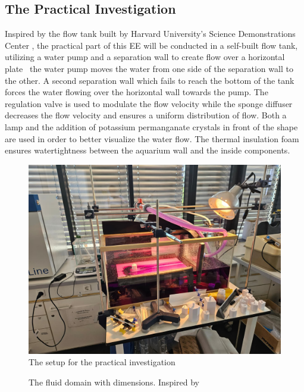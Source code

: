 \subsection{The Practical Investigation}
Inspired by the flow tank built by Harvard University’s Science Demonstrations Center \parencite{noauthor_vortex_nodate}, the practical part of this EE will be conducted in a self-built flow tank, utilizing a water pump and a separation wall to create flow over a horizontal plate \textemdash\ the water pump moves the water from one side of the separation wall to the other. A second separation wall which fails to reach the bottom of the tank forces the water flowing over the horizontal wall towards the pump. The regulation valve is used to modulate the flow velocity while the sponge diffuser decreases the flow velocity and ensures a uniform distribution of flow. Both a lamp and the addition of potassium permanganate crystals in front of the shape are used in order to better visualize the water flow. The thermal insulation foam ensures watertightness between the aquarium wall and the inside components.

\begin{figure}[H]
	\centering
	\includegraphics[width=\textwidth]{images/overallSetup.jpg}
	\caption{The setup for the practical investigation}
	\label{fig:overallSetup}
\end{figure}

\begin{figure}[H]
	
	\begin{center}
		\begin{tikzpicture}[x=\unitL, y=\unitL, >=stealth, line width=1pt]
			
		\end{tikzpicture}
	\end{center}
	\caption{The fluid domain with dimensions. Inspired by \textcite{comflics_openfoam_2014}}
	\label{fig:practicalSetup}
\end{figure}

